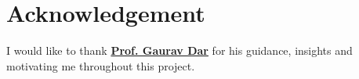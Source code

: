\documentclass[numbered]{ivt-style/standard}
\begin{document}

% 
% 

\clearpage
{}
\renewcommand{\bibsection}{\section*{References}}








\section*{Acknowledgement}

I would like to thank \textbf{\href{https://www.bits-pilani.ac.in/goa/gaurav-dar/}{Prof. Gaurav Dar}} for his guidance, insights and motivating me throughout this project. 
\end{document}
